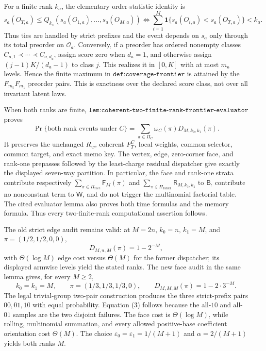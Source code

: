 For a finite rank \(k_a\), the elementary order-statistic identity is
\[
s_a(O_{T,a})\le Q_{k_a}(s_a(O_{1,a}),\ldots,s_a(O_{M,a}))
\iff
\sum_{i=1}^M\mathbf 1\{s_a(O_{i,a})<s_a(O_{T,a})\}<k_a.
\tag{1}
\]
Thus ties are handled by strict prefixes and the event depends on \(s_a\) only through its total preorder on \(\mathcal O_a\). Conversely, if a preorder has ordered nonempty classes
\(C_{a,1}\prec\cdots\prec C_{a,d_a}\), assign score zero when \(d_a=1\), and otherwise assign
\((j-1)K/(d_a-1)\) to class \(j\). This realizes it in \([0,K]\) with at most \(m_a\) levels. Hence the finite maximum in
\(\texttt{def:coverage-frontier}\) is attained by the
\(F_{m_0}F_{m_1}\) preorder pairs. This is exactness over the declared score class, not over all invariant latent laws.

When both ranks are finite,
\(\texttt{lem:coherent-two-finite-rank-frontier-evaluator}\) proves
\[
\Pr\{\text{both rank events under }C\}
=\sum_{\pi\in\Pi_C}\omega_C(\pi)D_{M,k_0,k_1}(\pi).
\tag{2}
\]
It preserves the unchanged \(R_w\), coherent \(P_T^C\), local weights, common selector, common target, and exact memo key. The vertex, edge, zero-corner face, and rank-one prepasses followed by the least-charge residual dispatcher give exactly the displayed seven-way partition. In particular, the face and rank-one strata contribute respectively
\(\sum_{\pi\in\Pi_{\mathrm{face}}}\mathsf F_M(\pi)\) and \(\sum_{\pi\in\Pi_{\mathrm{rank1}}}\mathsf R_{M,k_0,k_1}\) to \(\mathsf B\), contribute no nonconstant term to \(\mathsf W\), and do not trigger the multinomial factorial table. The cited evaluator lemma also proves both time formulas and the memory formula. Thus every two-finite-rank computational assertion follows.

The old strict edge audit remains valid: at \(M=2n\), \(k_0=n\), \(k_1=M\), and \(\pi=(1/2,1/2,0,0)\),
\[
D_{M,n,M}(\pi)=1-2^{-M},
\]
with \(\Theta(\log M)\) edge cost versus \(\Theta(M)\) for the former dispatcher; its displayed armwise levels yield the stated ranks. The new face audit in the same lemma gives, for every \(M\ge2\),
\[
k_0=k_1=M,\qquad
\pi=(1/3,1/3,1/3,0),\qquad
D_{M,M,M}(\pi)=1-2\cdot3^{-M}.
\tag{3}
\]
The legal trivial-group two-pair construction produces the three strict-prefix pairs \(00,01,10\) with equal probability. Equation (3) follows because the all-\(10\) and all-\(01\) samples are the two disjoint failures. The face cost is \(\Theta(\log M)\), while rolling, multinomial summation, and every allowed positive-base coefficient orientation cost \(\Theta(M)\). The choice
\(\varepsilon_0=\varepsilon_1=1/(M+1)\) and
\(\alpha=2/(M+1)\) yields both ranks \(M\).

